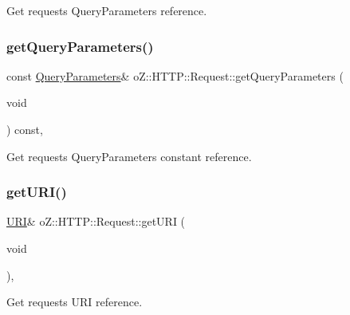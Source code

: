 Get request\textquotesingle{}s Query\+Parameters reference. 

\mbox{\label{classo_z_1_1_h_t_t_p_1_1_request_a0b3375eaf3e24509f63776847ce6b784}} 
\subsubsection{\texorpdfstring{getQueryParameters()}{getQueryParameters()}\hspace{0.1cm}{\footnotesize\ttfamily [2/2]}}
{\footnotesize\ttfamily const \mbox{\hyperlink{namespaceo_z_1_1_h_t_t_p_adf31e2c29997ec6637f36d62ab8944d6}{Query\+Parameters}}\& o\+Z\+::\+H\+T\+T\+P\+::\+Request\+::get\+Query\+Parameters (\begin{DoxyParamCaption}\item[{void}]{ }\end{DoxyParamCaption}) const\hspace{0.3cm}{\ttfamily [inline]}, {\ttfamily [noexcept]}}



Get request\textquotesingle{}s Query\+Parameters constant reference. 

\mbox{\label{classo_z_1_1_h_t_t_p_1_1_request_aaec3f19cb4ee6a18878166049df3253a}} 
\subsubsection{\texorpdfstring{getURI()}{getURI()}\hspace{0.1cm}{\footnotesize\ttfamily [1/2]}}
{\footnotesize\ttfamily \mbox{\hyperlink{namespaceo_z_1_1_h_t_t_p_a6d47156e2eac27750983fc1b54bd2ff8}{U\+RI}}\& o\+Z\+::\+H\+T\+T\+P\+::\+Request\+::get\+U\+RI (\begin{DoxyParamCaption}\item[{void}]{ }\end{DoxyParamCaption})\hspace{0.3cm}{\ttfamily [inline]}, {\ttfamily [noexcept]}}



Get request\textquotesingle{}s U\+RI reference. 

